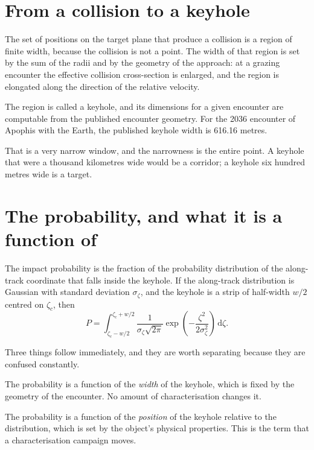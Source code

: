 \section{From a collision to a keyhole}

The set of positions on the target plane that produce a collision is a
region of finite width, because the collision is not a point. The width of
that region is set by the sum of the radii and by the geometry of the
approach: at a grazing encounter the effective collision cross-section is
enlarged, and the region is elongated along the direction of the relative
velocity.

The region is called a keyhole, and its dimensions for a given encounter are
computable from the published encounter geometry. For the 2036 encounter of
Apophis with the Earth, the published keyhole width is 616.16 metres.

That is a very narrow window, and the narrowness is the entire point. A
keyhole that were a thousand kilometres wide would be a corridor; a keyhole
six hundred metres wide is a target.

\section{The probability, and what it is a function of}

The impact probability is the fraction of the probability distribution of the
along-track coordinate that falls inside the keyhole. If the along-track
distribution is Gaussian with standard deviation \(\sigma_\zeta\), and the
keyhole is a strip of half-width \(w/2\) centred on \(\zeta_c\), then
\begin{equation}
P = \int_{\zeta_c - w/2}^{\zeta_c + w/2}
\frac{1}{\sigma_\zeta\sqrt{2\pi}}
\exp\!\left(-\frac{\zeta^{2}}{2\sigma_\zeta^{2}}\right)\,\mathrm{d}\zeta.
\label{eq:keyhole-prob}
\end{equation}

Three things follow immediately, and they are worth separating because they
are confused constantly.

The probability is a function of the \emph{width} of the keyhole, which is
fixed by the geometry of the encounter. No amount of characterisation changes
it.

The probability is a function of the \emph{position} of the keyhole relative
to the distribution, which is set by the object's physical properties. This
is the term that a characterisation campaign moves.

